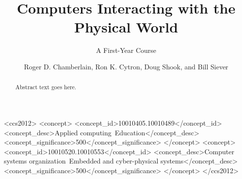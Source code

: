 \documentclass[sigconf]{acmart}
\begin{document}
\title{Computers Interacting with the Physical World}
\subtitle{A First-Year Course}


\author{Roger D. Chamberlain, Ron K. Cytron, Doug Shook, and Bill Siever}


\renewcommand{\shortauthors}{R. D. Chamberlain et al.}

\newcommand{\FIXME}[1]{\textcolor{red}{FIXME: #1}}

\begin{abstract}
Abstract text goes here.
\end{abstract}

%
%
 \begin{CCSXML}
<ccs2012>
<concept>
<concept_id>10010405.10010489</concept_id>
<concept_desc>Applied computing~Education</concept_desc>
<concept_significance>500</concept_significance>
</concept>
<concept>
<concept_id>10010520.10010553</concept_id>
<concept_desc>Computer systems organization~Embedded and cyber-physical systems</concept_desc>
<concept_significance>500</concept_significance>
</concept>
</ccs2012>
\end{CCSXML}





\maketitle










\end{document}

